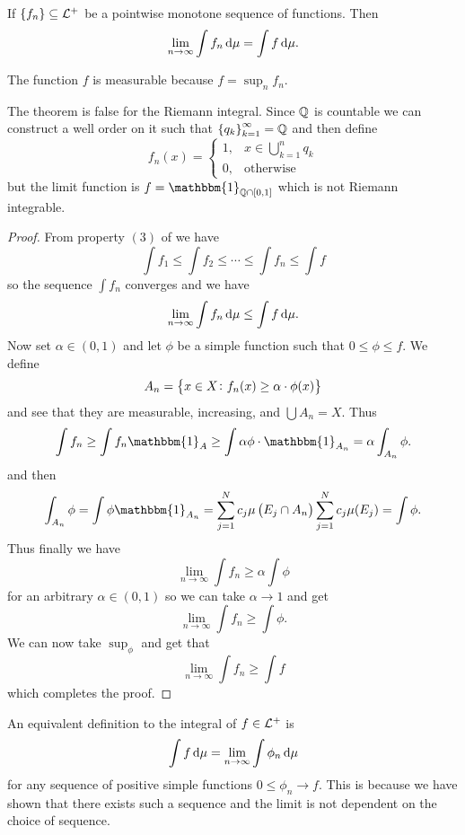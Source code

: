 \documentclass[11pt,a4paper]{article}
\begin{document}
\begin{theorem}
  If $\set{f_n} \subseteq \mathcal{L}^+$ be a pointwise monotone sequence of functions.
  Then
  \[
    \lim_{n \to \infty} \int f_n \dmu = \int f \dmu.
  \]
\end{theorem}
\begin{remark}
  The function $f$ is measurable because $f = \sup_{n} f_n$.
\end{remark}
\begin{remark}
  The theorem is false for the Riemann integral.
  Since $\mathbb{Q}$ is countable we can construct a well order on it such that
  $\set{q_k}_{k=1}^{\infty} = \mathbb{Q}$ and then define
  \[
    f_n(x) = \begin{cases}
      1, &x\in \bigcup_{k=1}^{n} q_k \\
      0, &\text{otherwise}
    \end{cases}
  \]
  but the limit function is $f = \mathbbm{1}_{\Q \cap [0,1]}$ which is not
  Riemann integrable.
\end{remark}
\begin{proof}
  From property $(3)$ of %
  we have
  \[
    \int f_1 \le \int f_2 \le \cdots \le \int f_n \le \int f
  \]
  so the sequence $\int f_n$ converges and we have
  \[
    \lim_{n \to \infty} \int f_n \dmu \le \int f \dmu.
  \]
  Now set $\alpha \in (0,1)$ and let $\phi$ be a simple function such that
  $0 \le \phi \le f$.
  We define
  \[
    A_n =\set{x \in X \colon f_n(x) \geq \alpha \cdot \phi(x)}
  \]
  and see that they are measurable, increasing, and $\bigcup A_n = X$.
  Thus
  \[
    \int f_n \geq
    \int f_n \mathbbm{1}_{A} \geq
    \int \alpha \phi \cdot \mathbbm{1}_{A_n} =
    \alpha \int_{A_n} \phi.
  \]
  and then
  \[
    \int_{A_n} \phi =
    \int \phi \mathbbm{1}_{A_n} =
    \sum_{j=1}^{N} c_j \mu\del{E_j \cap A_n} %
    \sum_{j=1}^{N} c_j \mu(E_j) = \int \phi.
  \]
  Thus finally we have
  \[
    \lim_{n \to \infty} \int f_n \geq \alpha \int \phi
  \]
  for an arbitrary $\alpha \in (0,1)$ so we can take $\alpha \to 1$
  and get
  \[
    \lim_{n \to \infty} \int f_n \geq \int \phi.
  \]
  We can now take $\sup_{\phi}$ and get that
  \[
    \lim_{n \to \infty} \int f_n \geq \int f
  \]
  which completes the proof.
\end{proof}
\begin{corollary}
  An equivalent definition to the integral of $f \in \mathcal{L}^+$ is
  \[
    \int f \dmu = \lim_{n \to \infty} \int \phi_n \dmu
  \]
  for any sequence of positive simple functions $0 \le \phi_n \to f$.
  This is because we have shown that there exists such a sequence and the
  limit is not dependent on the choice of sequence.
\end{corollary}






\end{document}
